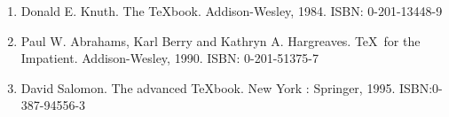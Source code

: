 \begin{enumerate}%
\item Donald E. Knuth. The \TeX book. 
Addison-Wesley, 1984. ISBN: 0-201-13448-9

\item Paul W. Abrahams, 
Karl Berry and Kathryn A. Hargreaves. 
\TeX\ for the Impatient. 
Addison-Wesley, 1990. ISBN: 0-201-51375-7

\item David Salomon. 
The advanced \TeX book. 
New York : Springer, 1995. ISBN:0-387-94556-3
\end{enumerate}

